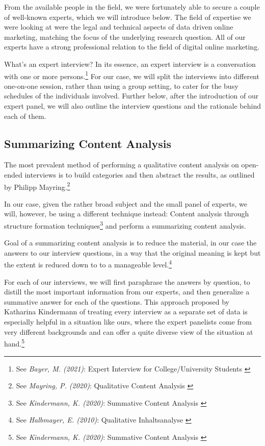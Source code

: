 From the available people in the field, we were fortunately able to secure a couple of well-known experts, which we will introduce below. The field of expertise we were looking at were the legal and technical aspects of data driven online marketing, matching the focus of the underlying research question. All of our experts have a strong professional relation to the field of digital online marketing.

What's an expert interview? In its essence, an expert interview is a conversation with one or more persons.\footnote{See \textit{Bayer, M. (2021)}: Expert Interview for College/University Students \cite{whatIsInterview}} For our case, we will split the interviews into different one-on-one session, rather than using a group setting, to cater for the busy schedules of the individuals involved. Further below, after the introduction of our expert panel, we will also outline the interview questions and the rationale behind each of them.

\subsection{Summarizing Content Analysis} 

The most prevalent method of performing a qualitative content analysis on open-ended interviews is to build categories and then abstract the results, as outlined by Philipp Mayring.\footnote{See \textit{Mayring, P. (2020)}: Qualitative Content Analysis \cite{qualiContent}}

In our case, given the rather broad subject and the small panel of experts, we will, however, be using a different technique instead: Content analysis through structure formation techniques\footnote{See \textit{Kindermann, K. (2020)}: Summative Content Analysis \cite{summaContent}} and perform a summarizing content analysis.

Goal of a summarizing content analysis is to reduce the material, in our case the answers to our interview questions, in a way that the original meaning is kept but the extent is reduced down to to a manageable level.\footnote{See \textit{Halbmayer, E. (2010)}: Qualitative Inhaltsanalyse \cite{summaryVienna}}

For each of our interviews, we will first paraphrase the answers by question, to distill the most important information from our experts, and then generalize a summative answer for each of the questions. This approach proposed by Katharina Kindermann of treating every interview as a separate set of data is especially helpful in a situation like ours, where the expert panelists come from very different backgrounds and can offer a quite diverse view of the situation at hand.\footnote{See \textit{Kindermann, K. (2020)}: Summative Content Analysis \cite{summaContent}}

